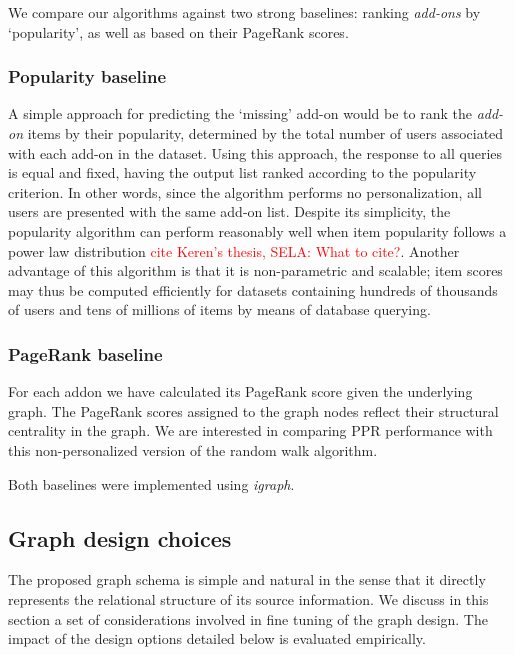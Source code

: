 \documentclass[11pt,oneside]{book}
\let\Oldsubsection\subsection
\renewcommand{\subsection}{\FloatBarrier\Oldsubsection}
\let\Oldsubsubsection\subsubsection
\renewcommand{\subsubsection}{\FloatBarrier\Oldsubsubsection}
\begin{document}
We compare our algorithms against two strong baselines: ranking {\it add-ons} by `popularity', as well as based on their PageRank scores. 

\subsubsection{Popularity baseline} 
A simple approach for predicting the `missing' add-on would be to rank the {\it add-on} items by their popularity, determined by the total number of users associated with each add-on in the dataset. Using this approach, the response to all queries is equal and fixed, having the output list ranked according to the popularity criterion. In other words, since the algorithm performs no personalization, all users are presented with the same
add-on list. Despite its simplicity, the popularity algorithm can perform reasonably well when item popularity follows a power law distribution  \textcolor{red}{cite Keren's thesis, SELA: What to cite?}. Another advantage of this algorithm is that it is non-parametric and scalable; item scores may thus be computed efficiently for datasets containing hundreds of thousands of users and tens of millions of items by means of database querying. 

\subsubsection{PageRank baseline} 
For each addon we have calculated its PageRank score given the underlying graph. The PageRank scores assigned to the graph nodes 
reflect their structural centrality in the graph. We are interested in comparing PPR performance with this non-personalized version of the random walk algorithm.

Both baselines were implemented using {\it igraph}. 

\subsection{Graph design choices}
\label{sec:design}

The proposed graph schema is simple and natural in the sense that it directly represents the relational structure of its source information. We discuss in this section a set of considerations involved in fine tuning of the graph design. The impact of the design options detailed below is evaluated empirically.  
\end{document}
